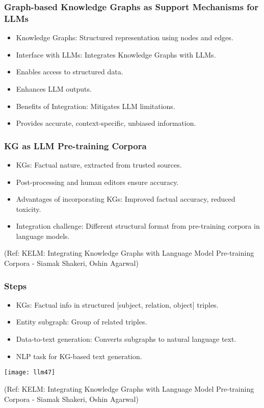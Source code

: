 \begin{frame}[fragile]\frametitle{Graph-based Knowledge Graphs as Support Mechanisms for LLMs}

\begin{itemize}
\item Knowledge Graphs: Structured representation using nodes and edges.
\item Interface with LLMs: Integrates Knowledge Graphs with LLMs.
\item Enables access to structured data.
\item Enhances LLM outputs.
\item Benefits of Integration: Mitigates LLM limitations.
\item Provides accurate, context-specific, unbiased information.
\end{itemize}	

\end{frame}


\begin{frame}[fragile]\frametitle{KG as LLM Pre-training Corpora}

\begin{itemize}
\item KGs: Factual nature, extracted from trusted sources.
\item Post-processing and human editors ensure accuracy.
\item Advantages of incorporating KGs: Improved factual accuracy, reduced toxicity.
\item Integration challenge: Different structural format from pre-training corpora in language models.
\end{itemize}	

{\tiny (Ref: KELM: Integrating Knowledge Graphs with Language Model Pre-training Corpora - Siamak Shakeri, Oshin Agarwal)}
\end{frame}


\begin{frame}[fragile]\frametitle{Steps}

\begin{itemize}
\item  KGs: Factual info in structured [subject, relation, object] triples.
\item  Entity subgraph: Group of related triples.
\item  Data-to-text generation: Converts subgraphs to natural language text.
\item  NLP task for KG-based text generation.
\end{itemize}

\begin{center}
\texttt{[image: llm47]}
\end{center}	

{\tiny (Ref: KELM: Integrating Knowledge Graphs with Language Model Pre-training Corpora - Siamak Shakeri, Oshin Agarwal)}
\end{frame}




